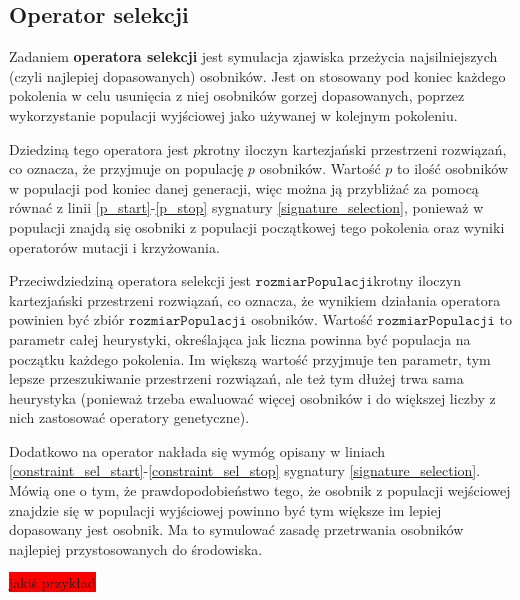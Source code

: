 \documentclass[twoside]{iisthesis}
\newcommand{\todo}{\colorbox{red}}
\newcommand{\param}{\mathtt}
\begin{document}
\subsection{Operator selekcji} \label{subsection_natSel}

Zadaniem \textbf{operatora selekcji} jest symulacja zjawiska przeżycia najsilniejszych (czyli najlepiej dopasowanych) osobników. Jest on stosowany pod koniec każdego pokolenia w celu usunięcia z niej osobników gorzej dopasowanych, poprzez wykorzystanie populacji wyjściowej jako używanej w kolejnym pokoleniu.

Dziedziną tego operatora jest $p$krotny iloczyn kartezjański przestrzeni rozwiązań, co oznacza, że przyjmuje on populację $p$ osobników. Wartość $p$ to ilość osobników w populacji pod koniec danej generacji, więc można ją przybliżać za pomocą równać z linii \ref{p_start}-\ref{p_stop} sygnatury \ref{signature_selection}, ponieważ w populacji znajdą się osobniki z populacji początkowej tego pokolenia oraz wyniki operatorów mutacji i krzyżowania. 

Przeciwdziedziną operatora selekcji jest $\param{rozmiarPopulacji}$krotny iloczyn kartezjański przestrzeni rozwiązań, co oznacza, że wynikiem działania operatora powinien być zbiór $\param{rozmiarPopulacji}$ osobników. Wartość $\param{rozmiarPopulacji}$ to parametr całej heurystyki, określająca jak liczna powinna być populacja na początku każdego pokolenia. Im większą wartość przyjmuje ten parametr, tym lepsze przeszukiwanie przestrzeni rozwiązań, ale też tym dłużej trwa sama heurystyka (ponieważ trzeba ewaluować więcej osobników i do większej liczby z nich zastosować operatory genetyczne). 

Dodatkowo na operator nakłada się wymóg opisany w liniach \ref{constraint_sel_start}-\ref{constraint_sel_stop} sygnatury \ref{signature_selection}. Mówią one o tym, że prawdopodobieństwo tego, że osobnik z populacji wejściowej znajdzie się w populacji wyjściowej powinno być tym większe im lepiej dopasowany jest osobnik. Ma to symulować zasadę przetrwania osobników najlepiej przystosowanych do środowiska.

\todo{jakiś przykład}
\end{document}
